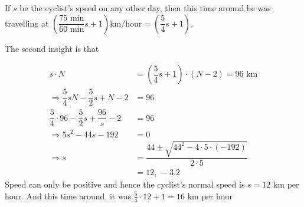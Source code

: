 \begin{solution}
	If $s$ be the cyclist's speed on any other day, then this time around he was 
	travelling at $\left(\dfrac{75\text{ min}}{60\text{ min}}s + 1\right) \text{km/hour} = \left(\dfrac{5}{4}s + 1\right)$.
	
	The second insight is that 
	
	\begin{align}
		s\cdot N &= \left( \dfrac{5}{4}s + 1 \right)\cdot (N-2) = 96\text{ km} \\
		\Rightarrow \dfrac{5}{4}sN - \dfrac{5}{2}s + N - 2 &= 96 \\
		\dfrac{5}{4}\cdot 96 - \dfrac{5}{2}s + \dfrac{96}{s} - 2 &= 96 \\
		\Rightarrow 5s^2 - 44s - 192 &= 0 \\
		\Rightarrow s &= \dfrac{44\pm\sqrt{44^2-4\cdot 5 \cdot (-192)}}{2\cdot 5} \\
		              &= 12,\, -3.2
	\end{align}
	Speed can only be positive and hence the cyclist's normal speed is $s = 12$ km per hour.
	And this time around, it was $\frac{5}{4}\cdot 12 + 1 = 16$ km per hour
\end{solution}

